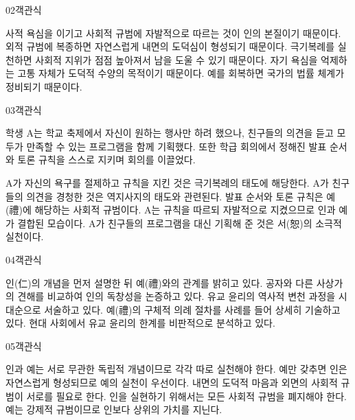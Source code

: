 \documentclass[fs85,seriesWit]{korfarm-base}
\begin{document}
\begin{kfQBlock}{02}{객관식}
\begin{kfChoices}
\kfChoice 사적 욕심을 이기고 사회적 규범에 자발적으로 따르는 것이 인의 본질이기 때문이다.
\kfChoice 외적 규범에 복종하면 자연스럽게 내면의 도덕심이 형성되기 때문이다.
\kfChoice 극기복례를 실천하면 사회적 지위가 점점 높아져서 남을 도울 수 있기 때문이다.
\kfChoice 자기 욕심을 억제하는 고통 자체가 도덕적 수양의 목적이기 때문이다.
\kfChoice 예를 회복하면 국가의 법률 체계가 정비되기 때문이다.
\end{kfChoices}
\end{kfQBlock}

\begin{kfQBlock}{03}{객관식}
\begin{kfEvidence}학생 A는 학교 축제에서 자신이 원하는 행사만 하려 했으나, 친구들의 의견을 듣고 모두가 만족할 수 있는 프로그램을 함께 기획했다. 또한 학급 회의에서 정해진 발표 순서와 토론 규칙을 스스로 지키며 회의를 이끌었다.\end{kfEvidence}
\begin{kfChoices}
\kfChoice A가 자신의 욕구를 절제하고 규칙을 지킨 것은 극기복례의 태도에 해당한다.
\kfChoice A가 친구들의 의견을 경청한 것은 역지사지의 태도와 관련된다.
\kfChoice 발표 순서와 토론 규칙은 예(禮)에 해당하는 사회적 규범이다.
\kfChoice A는 규칙을 따르되 자발적으로 지켰으므로 인과 예가 결합된 모습이다.
\kfChoice A가 친구들의 프로그램을 대신 기획해 준 것은 서(恕)의 소극적 실천이다.
\end{kfChoices}
\end{kfQBlock}

\begin{kfQBlock}{04}{객관식}
\begin{kfChoices}
\kfChoice 인(仁)의 개념을 먼저 설명한 뒤 예(禮)와의 관계를 밝히고 있다.
\kfChoice 공자와 다른 사상가의 견해를 비교하여 인의 독창성을 논증하고 있다.
\kfChoice 유교 윤리의 역사적 변천 과정을 시대순으로 서술하고 있다.
\kfChoice 예(禮)의 구체적 의례 절차를 사례를 들어 상세히 기술하고 있다.
\kfChoice 현대 사회에서 유교 윤리의 한계를 비판적으로 분석하고 있다.
\end{kfChoices}
\end{kfQBlock}

\begin{kfQBlock}{05}{객관식}
\begin{kfChoices}
\kfChoice 인과 예는 서로 무관한 독립적 개념이므로 각각 따로 실천해야 한다.
\kfChoice 예만 갖추면 인은 자연스럽게 형성되므로 예의 실천이 우선이다.
\kfChoice 내면의 도덕적 마음과 외면의 사회적 규범이 서로를 필요로 한다.
\kfChoice 인을 실현하기 위해서는 모든 사회적 규범을 폐지해야 한다.
\kfChoice 예는 강제적 규범이므로 인보다 상위의 가치를 지닌다.
\end{kfChoices}
\end{kfQBlock}
\end{document}
